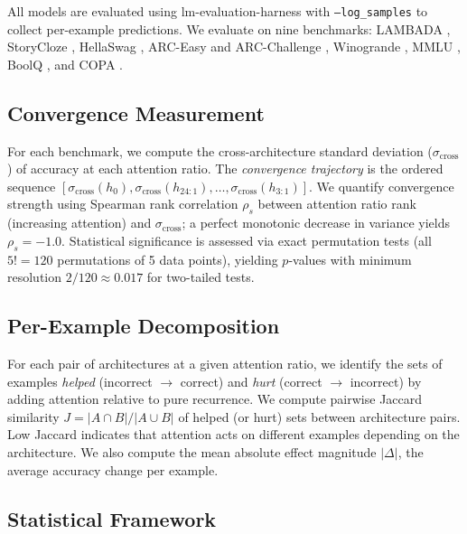 \documentclass[11pt]{article}
\begin{document}
All models are evaluated using lm-evaluation-harness \citep{gao2021framework} with \texttt{--log\_samples} to collect per-example predictions.
We evaluate on nine benchmarks: LAMBADA \citep{paperno2016lambada}, StoryCloze \citep{mostafazadeh2016corpus}, HellaSwag \citep{zellers2019hellaswag}, ARC-Easy and ARC-Challenge \citep{clark2018think}, Winogrande \citep{sakaguchi2020winogrande}, MMLU \citep{hendrycks2021measuring}, BoolQ \citep{clark2019boolq}, and COPA \citep{roemmele2011choice}.

\subsection{Convergence Measurement}

For each benchmark, we compute the cross-architecture standard deviation ($\sigma_\text{cross}$) of accuracy at each attention ratio.
The \textit{convergence trajectory} is the ordered sequence $[\sigma_\text{cross}(h_0), \sigma_\text{cross}(h_{24:1}), \ldots, \sigma_\text{cross}(h_{3:1})]$.
We quantify convergence strength using Spearman rank correlation $\rho_s$ between attention ratio rank (increasing attention) and $\sigma_\text{cross}$; a perfect monotonic decrease in variance yields $\rho_s = {-}1.0$.
Statistical significance is assessed via exact permutation tests (all $5! = 120$ permutations of 5 data points), yielding $p$-values with minimum resolution $2/120 \approx 0.017$ for two-tailed tests.

\subsection{Per-Example Decomposition}

For each pair of architectures at a given attention ratio, we identify the sets of examples \textit{helped} (incorrect $\to$ correct) and \textit{hurt} (correct $\to$ incorrect) by adding attention relative to pure recurrence.
We compute pairwise Jaccard similarity $J = |A \cap B| / |A \cup B|$ of helped (or hurt) sets between architecture pairs.
Low Jaccard indicates that attention acts on different examples depending on the architecture.
We also compute the mean absolute effect magnitude $|\Delta|$, the average accuracy change per example.

\subsection{Statistical Framework}
\label{sec:statframework}
\end{document}
